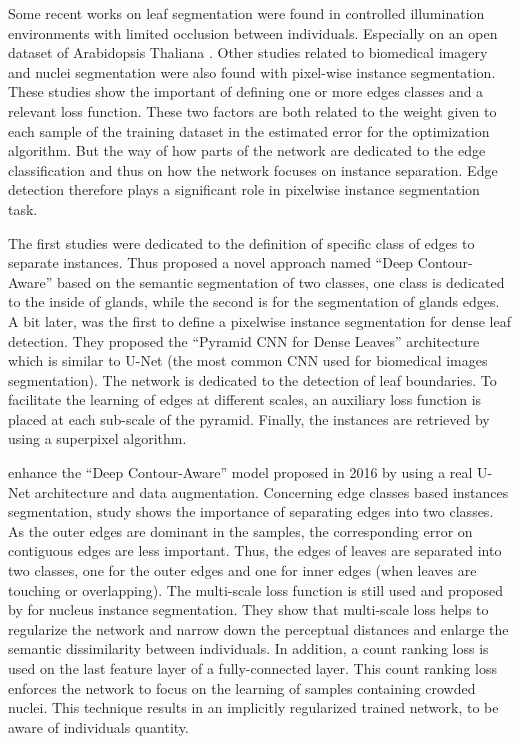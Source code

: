 \documentclass[../thesis.tex]{subfiles}
\begin{document}
    Some recent works on leaf segmentation were found in controlled illumination environments with limited occlusion between individuals. Especially on an open dataset of Arabidopsis Thaliana \cite{scharr2016leaf}. Other studies related to biomedical imagery and nuclei segmentation were also found with pixel-wise instance segmentation. These studies show the important of defining one or more edges classes and a relevant loss function. These two factors are both related to the weight given to each sample of the training dataset in the estimated error for the optimization algorithm. But the way of how parts of the network are dedicated to the edge classification and thus on how the network focuses on instance separation. Edge detection therefore plays a significant role in pixelwise instance segmentation task.
    
    \newpage
    The first studies were dedicated to the definition of specific class of edges to separate instances. Thus \cite{chen2016dcan} proposed a novel approach named ``Deep Contour-Aware'' based on the semantic segmentation of two classes, one class is dedicated to the inside of glands, while the second is for the segmentation of glands edges. A bit later, \cite{morris2018pyramid} was the first to define a pixelwise instance segmentation for dense leaf detection. They proposed the ``Pyramid CNN for Dense Leaves'' architecture which is similar to U-Net (the most common CNN used for biomedical images segmentation). The network is dedicated to the detection of leaf boundaries. To facilitate the learning of edges at different scales, an auxiliary loss function is placed at each sub-scale of the pyramid. Finally, the instances are retrieved by using a superpixel algorithm.
    
    \cite{Cui_2019} enhance the ``Deep Contour-Aware'' model proposed in 2016 by using a real U-Net architecture and data augmentation. Concerning edge classes based instances segmentation, \cite{bell2019leaf} study shows the importance of separating edges into two classes. As the outer edges are dominant in the samples, the corresponding error on contiguous edges are less important. Thus, the edges of leaves are separated into two classes, one for the outer edges and one for inner edges (when leaves are touching or overlapping). The multi-scale loss function is still used and proposed by \cite{xie2020instanceaware} for nucleus instance segmentation. They show that multi-scale loss helps to regularize the network and narrow down the perceptual distances and enlarge the semantic dissimilarity between individuals. In addition, a count ranking loss is used on the last feature layer of a fully-connected layer. This count ranking loss enforces the network to focus on the learning of samples containing crowded nuclei. This technique results in an implicitly regularized trained network, to be aware of individuals quantity.
    
\end{document}
